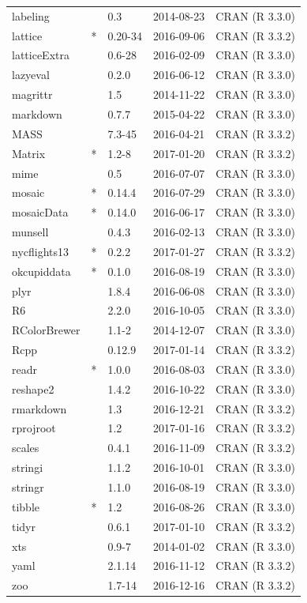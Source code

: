 \documentclass[]{tufte-book}
\theoremstyle{definition}
\theoremstyle{definition}
\theoremstyle{remark}
\begin{document}
\begin{longtable}{lllll}
labeling &  & 0.3 & 2014-08-23 & CRAN (R 3.3.0)\\
lattice & * & 0.20-34 & 2016-09-06 & CRAN (R 3.3.2)\\
latticeExtra &  & 0.6-28 & 2016-02-09 & CRAN (R 3.3.0)\\
lazyeval &  & 0.2.0 & 2016-06-12 & CRAN (R 3.3.0)\\
\addlinespace
magrittr &  & 1.5 & 2014-11-22 & CRAN (R 3.3.0)\\
markdown &  & 0.7.7 & 2015-04-22 & CRAN (R 3.3.0)\\
MASS &  & 7.3-45 & 2016-04-21 & CRAN (R 3.3.2)\\
Matrix & * & 1.2-8 & 2017-01-20 & CRAN (R 3.3.2)\\
mime &  & 0.5 & 2016-07-07 & CRAN (R 3.3.0)\\
\addlinespace
mosaic & * & 0.14.4 & 2016-07-29 & CRAN (R 3.3.0)\\
mosaicData & * & 0.14.0 & 2016-06-17 & CRAN (R 3.3.0)\\
munsell &  & 0.4.3 & 2016-02-13 & CRAN (R 3.3.0)\\
nycflights13 & * & 0.2.2 & 2017-01-27 & CRAN (R 3.3.2)\\
okcupiddata & * & 0.1.0 & 2016-08-19 & CRAN (R 3.3.0)\\
\addlinespace
plyr &  & 1.8.4 & 2016-06-08 & CRAN (R 3.3.0)\\
R6 &  & 2.2.0 & 2016-10-05 & CRAN (R 3.3.0)\\
RColorBrewer &  & 1.1-2 & 2014-12-07 & CRAN (R 3.3.0)\\
Rcpp &  & 0.12.9 & 2017-01-14 & CRAN (R 3.3.2)\\
readr & * & 1.0.0 & 2016-08-03 & CRAN (R 3.3.0)\\
\addlinespace
reshape2 &  & 1.4.2 & 2016-10-22 & CRAN (R 3.3.0)\\
rmarkdown &  & 1.3 & 2016-12-21 & CRAN (R 3.3.2)\\
rprojroot &  & 1.2 & 2017-01-16 & CRAN (R 3.3.2)\\
scales &  & 0.4.1 & 2016-11-09 & CRAN (R 3.3.2)\\
stringi &  & 1.1.2 & 2016-10-01 & CRAN (R 3.3.0)\\
\addlinespace
stringr &  & 1.1.0 & 2016-08-19 & CRAN (R 3.3.0)\\
tibble & * & 1.2 & 2016-08-26 & CRAN (R 3.3.0)\\
tidyr &  & 0.6.1 & 2017-01-10 & CRAN (R 3.3.2)\\
xts &  & 0.9-7 & 2014-01-02 & CRAN (R 3.3.0)\\
yaml &  & 2.1.14 & 2016-11-12 & CRAN (R 3.3.2)\\
zoo &  & 1.7-14 & 2016-12-16 & CRAN (R 3.3.2)\\
\bottomrule
\end{longtable}
\end{document}
